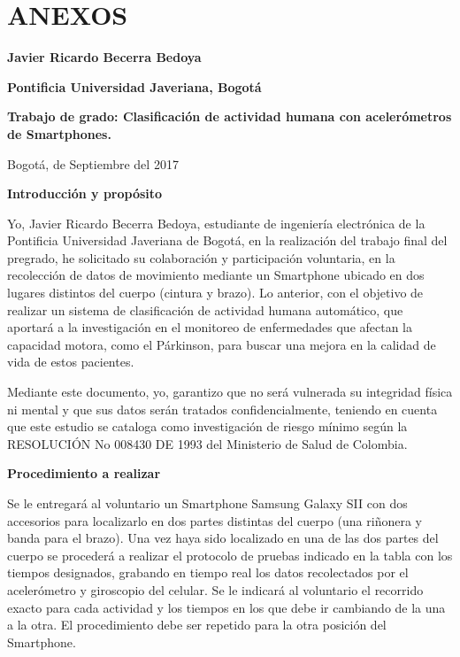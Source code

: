 \documentclass[11pt]{report}
\begin{document}
 


\chapter{ANEXOS}

\noindent
\textbf{Javier Ricardo Becerra Bedoya}

\noindent
\textbf{Pontificia Universidad Javeriana, Bogotá}

\noindent
\textbf{Trabajo de grado: Clasificación de actividad humana con acelerómetros de Smartphones.}

Bogotá,   \indent   \indent de  Septiembre del 2017

\medskip
\noindent
\textbf{Introducción y propósito}

Yo, Javier Ricardo Becerra Bedoya, estudiante de ingeniería electrónica de la Pontificia Universidad Javeriana de Bogotá, en la realización del trabajo final del pregrado, he solicitado su colaboración y participación voluntaria, en la recolección de datos de movimiento mediante un Smartphone ubicado en dos lugares distintos del cuerpo (cintura y brazo). Lo anterior, con el objetivo de realizar un sistema  de clasificación de actividad humana automático, que aportará a la investigación en el monitoreo de enfermedades que afectan la capacidad motora, como el Párkinson, para buscar una mejora en la calidad de vida de estos pacientes.
\par
\medskip
\noindent
Mediante este documento, yo, garantizo que no será vulnerada su integridad física ni mental y que sus datos serán tratados confidencialmente, teniendo en cuenta que este estudio se cataloga como investigación de riesgo mínimo según la RESOLUCIÓN No 008430 DE 1993 del Ministerio de Salud de Colombia. 

\par
\medskip
\noindent
\textbf{Procedimiento a realizar} 

\par
\medskip
\noindent
Se le entregará al voluntario un Smartphone Samsung Galaxy SII con dos accesorios para localizarlo en dos partes distintas del cuerpo (una riñonera y banda para el brazo). Una vez haya sido localizado en una de las dos partes del cuerpo se procederá a realizar el protocolo de pruebas indicado en la tabla con los tiempos designados, grabando en tiempo real los datos recolectados por el acelerómetro y giroscopio del celular.  Se le indicará al voluntario el recorrido exacto para cada actividad y los tiempos en los que debe ir cambiando de la una a la otra. El procedimiento debe ser repetido para la otra posición del Smartphone.
\end{document}
